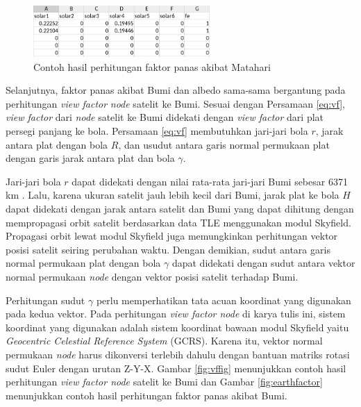\begin{figure}[H]
\setlength{}
\begin{center}
\includegraphics[width=0.6\textwidth]{fig/solarfactor.png}
\caption{Contoh hasil perhitungan faktor panas akibat Matahari}
\label{fig:solarfactor}
\end{center}
\end{figure}

Selanjutnya, faktor panas akibat Bumi dan albedo sama-sama bergantung pada
perhitungan \textit{view factor} \textit{node} satelit ke Bumi. Sesuai dengan
Persamaan \ref{eq:vf}, \textit{view factor} dari \textit{node} satelit ke Bumi
didekati dengan \textit{view factor} dari plat persegi panjang ke bola. Persamaan \ref{eq:vf} membutuhkan jari-jari bola $r$, jarak antara plat dengan bola $R$, dan usudut antara garis normal permukaan plat dengan garis jarak antara plat dan bola $\gamma$. 

Jari-jari bola $r$ dapat didekati dengan nilai rata-rata jari-jari Bumi sebesar
6371 km \cite{moritz}. Lalu, karena ukuran satelit jauh lebih kecil dari Bumi,
jarak plat ke bola $H$ dapat didekati dengan jarak antara satelit dan Bumi yang
dapat dihitung dengan mempropagasi orbit satelit berdasarkan data TLE
menggunakan modul Skyfield. Propagasi orbit lewat modul Skyfield juga
memungkinkan perhitungan vektor posisi satelit seiring perubahan waktu. Dengan
demikian, sudut antara garis normal permukaan plat dengan bola $\gamma$ dapat
didekati dengan sudut antara vektor normal permukaan \textit{node} dengan
vektor posisi satelit terhadap Bumi. 

Perhitungan sudut $\gamma$ perlu memperhatikan tata acuan koordinat yang
digunakan pada kedua vektor. Pada perhitungan \textit{view factor node} di
karya tulis ini, sistem koordinat yang digunakan adalah sistem koordinat bawaan
modul Skyfield yaitu \textit{Geocentric Celestial Reference System} (GCRS).
Karena itu, vektor normal permukaan \textit{node} harus dikonversi terlebih
dahulu dengan bantuan matriks rotasi sudut Euler dengan urutan Z-Y-X. Gambar
\ref{fig:vffig} menunjukkan contoh hasil perhitungan \textit{view factor node}
satelit ke Bumi dan Gambar \ref{fig:earthfactor} menunjukkan contoh hasil perhitungan faktor panas akibat Bumi.

